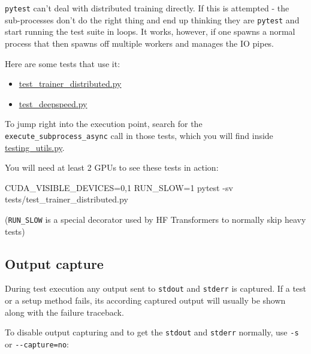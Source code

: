 \documentclass[
]{report}
\newenvironment{Shaded}{\begin{snugshade}}{\end{snugshade}}
\newcommand{\AttributeTok}[1]{\textcolor[rgb]{0.40,0.45,0.13}{#1}}
\newcommand{\ExtensionTok}[1]{\textcolor[rgb]{0.00,0.23,0.31}{#1}}
\newcommand{\NormalTok}[1]{\textcolor[rgb]{0.00,0.23,0.31}{#1}}
\newcommand{\OperatorTok}[1]{\textcolor[rgb]{0.37,0.37,0.37}{#1}}
\newcommand{\VariableTok}[1]{\textcolor[rgb]{0.07,0.07,0.07}{#1}}
\providecommand{\tightlist}{%
  \setlength{\itemsep}{0pt}\setlength{\parskip}{0pt}}\usepackage{longtable,booktabs,array}
\begin{document}
\texttt{pytest} can't deal with distributed training directly. If this
is attempted - the sub-processes don't do the right thing and end up
thinking they are \texttt{pytest} and start running the test suite in
loops. It works, however, if one spawns a normal process that then
spawns off multiple workers and manages the IO pipes.

Here are some tests that use it:

\begin{itemize}
\tightlist
\item
  \href{https://github.com/huggingface/transformers/blob/58e3d23e97078f361a533b9ec4a6a2de674ea52a/tests/trainer/test_trainer_distributed.py}{test\_trainer\_distributed.py}
\item
  \href{https://github.com/huggingface/transformers/blob/58e3d23e97078f361a533b9ec4a6a2de674ea52a/tests/deepspeed/test_deepspeed.py}{test\_deepspeed.py}
\end{itemize}

To jump right into the execution point, search for the
\texttt{execute\_subprocess\_async} call in those tests, which you will
find inside \url{testing_utils.py}.

You will need at least 2 GPUs to see these tests in action:

\begin{Shaded}
\begin{Highlighting}[]
\VariableTok{CUDA\_VISIBLE\_DEVICES}\OperatorTok{=}\NormalTok{0,1 }\VariableTok{RUN\_SLOW}\OperatorTok{=}\NormalTok{1 }\ExtensionTok{pytest} \AttributeTok{{-}sv}\NormalTok{ tests/test\_trainer\_distributed.py}
\end{Highlighting}
\end{Shaded}

(\texttt{RUN\_SLOW} is a special decorator used by HF Transformers to
normally skip heavy tests)

\subsection{Output capture}\label{output-capture}

During test execution any output sent to \texttt{stdout} and
\texttt{stderr} is captured. If a test or a setup method fails, its
according captured output will usually be shown along with the failure
traceback.

To disable output capturing and to get the \texttt{stdout} and
\texttt{stderr} normally, use \texttt{-s} or \texttt{-\/-capture=no}:
\end{document}
